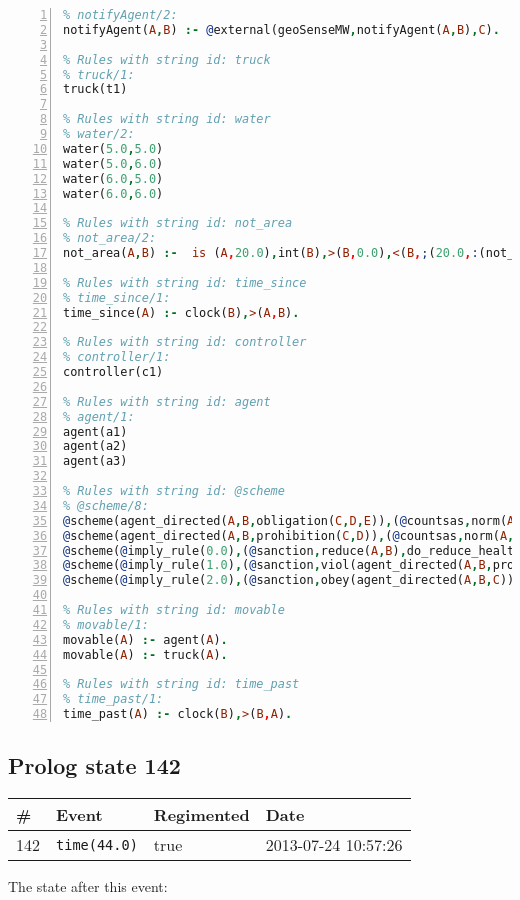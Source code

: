 \documentclass[11pt]{article}\usepackage[utf8]{inputenc}\usepackage{geometry}
\begin{document}
\begin{lstlisting}[language=Prolog, numbers=left]
% Rules with string id: notifyAgent
% notifyAgent/2:
notifyAgent(A,B) :- @external(geoSenseMW,notifyAgent(A,B),C).

% Rules with string id: truck
% truck/1:
truck(t1)

% Rules with string id: water
% water/2:
water(5.0,5.0)
water(5.0,6.0)
water(6.0,5.0)
water(6.0,6.0)

% Rules with string id: not_area
% not_area/2:
not_area(A,B) :-  is (A,20.0),int(B),>(B,0.0),<(B,;(20.0,:(not_area(A,B), is (-(B),20.0)))),int(A),>(A,0.0),<(A,;(20.0,:(area(A,B),-(int(A))))),int(B),>(A,0.0),>(B,0.0),<(A,21.0),<(B,21.0).

% Rules with string id: time_since
% time_since/1:
time_since(A) :- clock(B),>(A,B).

% Rules with string id: controller
% controller/1:
controller(c1)

% Rules with string id: agent
% agent/1:
agent(a1)
agent(a2)
agent(a3)

% Rules with string id: @scheme
% @scheme/8:
@scheme(agent_directed(A,B,obligation(C,D,E)),(@countsas,norm(A,B,F,obligation(C,D,E)),F),false,(listTrue(C)),(time_past(D)),false,[plus(viol(agent_directed(A,B,obligation(C,D,E))))|[]],[plus(obey(agent_directed(A,B,obligation(C,D,E))))|[]])
@scheme(agent_directed(A,B,prohibition(C,D)),(@countsas,norm(A,B,E,prohibition(C,D)),E),(listTrue(C)),false,(false),false,[plus(viol(agent_directed(A,B,prohibition(C,D))))|[]],[plus(obey(agent_directed(A,B,prohibition(C,D))))|[]])
@scheme(@imply_rule(0.0),(@sanction,reduce(A,B),do_reduce_health(A,B),notifyAgent(A,changed(status))),true,false,false,false,[min(reduce(A,B))|[]],[])
@scheme(@imply_rule(1.0),(@sanction,viol(agent_directed(A,B,prohibition(C,D))),do_sanction(D)),true,false,false,false,[min(viol(agent_directed(A,B,prohibition(C,D))))|[]],[])
@scheme(@imply_rule(2.0),(@sanction,obey(agent_directed(A,B,C))),true,false,false,false,[min(obey(agent_directed(A,B,C)))|[]],[])

% Rules with string id: movable
% movable/1:
movable(A) :- agent(A).
movable(A) :- truck(A).

% Rules with string id: time_past
% time_past/1:
time_past(A) :- clock(B),>(B,A).

\end{lstlisting}
\clearpage 
\subsection{Prolog state 142}
\begin{table}[ht]
\centering 
\begin{tabular}{l l l l} 
\textbf{\#} & \textbf{Event} & \textbf{Regimented} & \textbf{Date} \\ [0.5ex] 
\hline
142&\texttt{time(44.0)}&true&2013-07-24 10:57:26\\ [1ex] \hline\end{tabular}
\end{table}
The state after this event:
\end{document}
